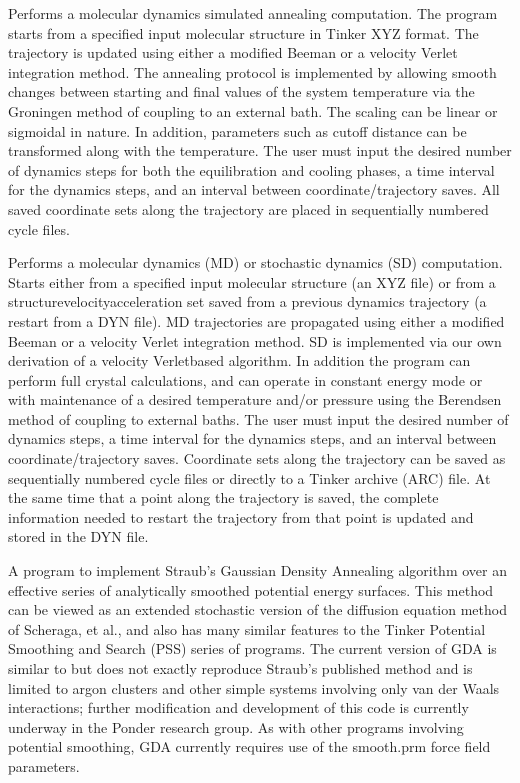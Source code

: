 \documentclass[letterpaper,11pt,english]{sphinxmanual}
\begin{document}

Performs a molecular dynamics simulated annealing computation. The program starts from a specified input molecular structure in Tinker XYZ format. The trajectory is updated using either a modified Beeman or a velocity Verlet integration method. The annealing protocol is implemented by allowing smooth changes between starting and final values of the system temperature via the Groningen method of coupling to an external bath. The scaling can be linear or sigmoidal in nature. In addition, parameters such as cutoff distance can be transformed along with the temperature. The user must input the desired number of dynamics steps for both the equilibration and cooling phases, a time interval for the dynamics steps, and an interval between coordinate/trajectory saves. All saved coordinate sets along the trajectory are placed in sequentially numbered cycle files.


Performs a molecular dynamics (MD) or stochastic dynamics (SD) computation. Starts either from a specified input molecular structure (an XYZ file) or from a structure\sphinxhyphen{}velocity\sphinxhyphen{}acceleration set saved from a previous dynamics trajectory (a restart from a DYN file). MD trajectories are propagated using either a modified Beeman or a velocity Verlet integration method. SD is implemented via our own derivation of a velocity Verlet\sphinxhyphen{}based algorithm. In addition the program can perform full crystal calculations, and can operate in constant energy mode or with maintenance of a desired temperature and/or pressure using the Berendsen method of coupling to external baths. The user must input the desired number of dynamics steps, a time interval for the dynamics steps, and an interval between coordinate/trajectory saves. Coordinate sets along the trajectory can be saved as sequentially numbered cycle files or directly to a Tinker archive (ARC) file. At the same time that a point along the trajectory is saved, the complete information needed to restart the trajectory from that point is updated and stored in the DYN file.


A program to implement Straub’s Gaussian Density Annealing algorithm over an effective series of analytically smoothed potential energy surfaces. This method can be viewed as an extended stochastic version of the diffusion equation method of Scheraga, et al., and also has many similar features to the Tinker Potential Smoothing and Search (PSS) series of programs. The current version of GDA is similar to but does not exactly reproduce Straub’s published method and is limited to argon clusters and other simple systems involving only van der Waals interactions; further modification and development of this code is currently underway in the Ponder research group. As with other programs involving potential smoothing, GDA currently requires use of the smooth.prm force field parameters.
\end{document}
